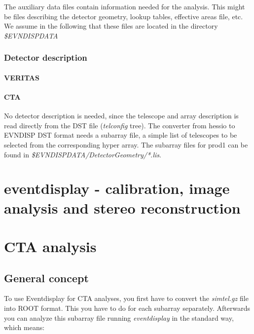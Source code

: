\documentclass[titlepage,a4paper,twoside,11pt]{report}
\begin{document}
The auxiliary data files contain information needed for the analysis. 
This might be files describing the detector geometry, lookup tables, effective areas file, etc.
We assume in the following that these files are located in the directory {\it \$EVNDISPDATA}

\subsection{Detector description}

\subsubsection{VERITAS}

\subsubsection{CTA}

No detector description is needed, since the telescope and array description is read directly from the DST file ({\it telconfig} tree).
The converter from hessio to EVNDISP DST format needs a subarray file, a simple list of telescopes to be selected from the corresponding hyper array. 
The subarray files for prod1 can be found in {\it \$EVNDISPDATA/DetectorGeometry/*.lis}.

\chapter{eventdisplay - calibration, image analysis and stereo reconstruction}

%
%

\chapter{CTA analysis}

\section{General concept}

To use Eventdisplay for CTA analyses, you first have to convert the {\it simtel.gz} file into ROOT format. 
This you have to do for each subarray separately.
Afterwards you can analyze this subarray file running {\it eventdisplay} in the standard way, which means:
\end{document}
